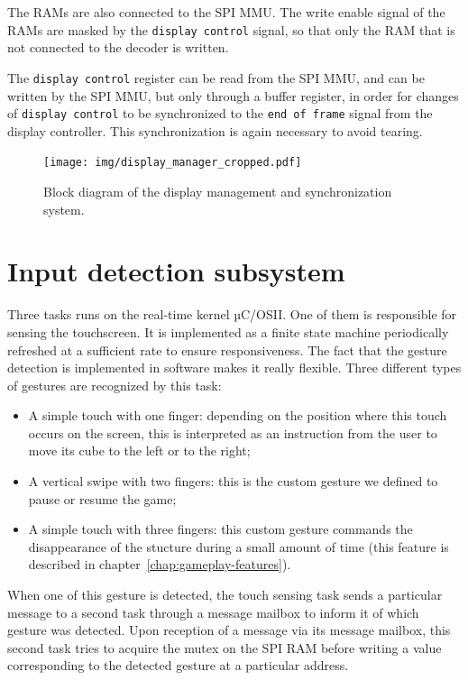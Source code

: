 \documentclass[english, DIV=13]{scrreprt}
\begin{document}
The RAMs are also connected to the SPI MMU. The write enable
signal of the RAMs are masked by the \texttt{display control} signal,
so that only the RAM that is not connected to the decoder is written.

The \texttt{display control} register can be read from the SPI MMU,
and can be written by the SPI MMU, but only through a buffer register,
in order for changes of \texttt{display control} to be synchronized
to the \texttt{end of frame} signal from the display controller.
This synchronization is again necessary to avoid tearing.

\begin{figure}[bth]
    \centering
    \texttt{[image: img/display\_manager\_cropped.pdf]}
    \caption{Block diagram of the display management and synchronization system.}
    \label{fig:display-manager}
\end{figure}

\section{Input detection subsystem}
\label{sec:input-det}

Three tasks runs on the real-time kernel µC/OSII. One of them is responsible
for sensing the touchscreen. It is implemented as a finite state machine periodically
refreshed at a sufficient rate to ensure responsiveness. The fact that the gesture
detection is implemented in software makes it really flexible. Three different types of
gestures are recognized by this task:
\begin{itemize}
    \item A simple touch with one finger: depending on the position where this touch
    occurs on the screen, this is interpreted as an instruction from the user to move
    its cube to the left or to the right;
    \item A vertical swipe with two fingers: this is the custom gesture we defined to
    pause or resume the game;
    \item A simple touch with three fingers: this custom gesture commands the
    disappearance of the stucture during a small amount of time (this feature is
    described in chapter~\ref{chap:gameplay-features}).
\end{itemize}
When one of this gesture is detected, the touch sensing task sends a particular
message to a second task through a message mailbox to inform it of which gesture
was detected. Upon reception of a message via its message mailbox, this second task
tries to acquire the mutex on the SPI RAM before writing a value corresponding
to the detected gesture at a particular address.
\end{document}
